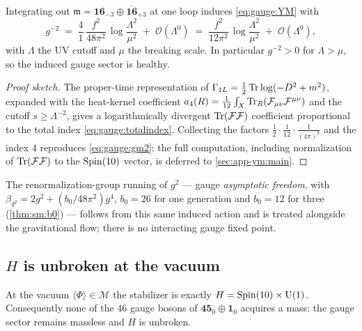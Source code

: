 \begin{theorem}\label{thm:gauge:coupling}
Integrating out $\mathfrak m=\mathbf{16}_{-3}\oplus\overline{\mathbf{16}}_{+3}$
at one loop induces \eqref{eq:gauge:YM} with
\begin{equation}\label{eq:gauge:gm2}
  g^{-2}
  \;=\;
  \frac{4}{1}\,\frac{f^{2}}{48\pi^{2}}\,
  \log\!\frac{\Lambda^{2}}{\mu^{2}}
  \;+\;\mathcal O(\Lambda^{0})
  \;=\;
  \frac{f^{2}}{12\pi^{2}}\,\log\!\frac{\Lambda^{2}}{\mu^{2}}
  \;+\;\mathcal O(\Lambda^{0}),
\end{equation}
with $\Lambda$ the UV cutoff and $\mu$ the breaking scale. In particular
$g^{-2}>0$ for $\Lambda>\mu$, so the induced gauge sector is healthy.
\end{theorem}

\begin{proof}[Proof sketch]
The proper-time representation of $\Gamma_{1L}=\tfrac12\operatorname{Tr}\log(-D^2+m^2)$,
expanded with the heat-kernel coefficient
$a_4(R)=\tfrac{1}{12}\int_X\operatorname{Tr}_R(\mathcal F_{\mu\nu}\mathcal F^{\mu\nu})$
and the cutoff $s\ge\Lambda^{-2}$, gives a logarithmically divergent
$\operatorname{Tr}(\mathcal F\mathcal F)$ coefficient proportional to the total index
\eqref{eq:gauge:totalindex}. Collecting the factors $\tfrac12\cdot\tfrac1{12}\cdot\tfrac1{(4\pi)^2}$
and the index $4$ reproduces \eqref{eq:gauge:gm2}; the full computation,
including normalization of $\operatorname{Tr}(\mathcal F\mathcal F)$ to the
$\operatorname{Spin}(10)$ vector, is deferred to \autoref{sec:app-ym:main}.
\end{proof}

The renormalization-group running of $g^{2}$ --- gauge \emph{asymptotic
freedom}, with $\beta_{g^2}=2g^2+(b_0/48\pi^2)g^4$, $b_0=26$ for one
generation and $b_0=12$ for three (\autoref{thm:sm:b0}) --- follows
from this same induced action and is treated alongside the gravitational
flow; there is no interacting gauge fixed point.

\subsection{$H$ is unbroken at the vacuum}
\label{sec:gauge:unbroken}

\begin{theorem}\label{thm:gauge:unbroken}
At the vacuum $\langle\Phi\rangle\in\mathcal M$ the stabilizer is exactly
$H=\operatorname{Spin}(10)\times\mathrm{U}(1)$. Consequently none of the $46$ gauge bosons of
$\mathbf{45}_{0}\oplus\mathbf 1_{0}$ acquires a mass: the gauge sector
remains massless and $H$ is unbroken.
\end{theorem}

